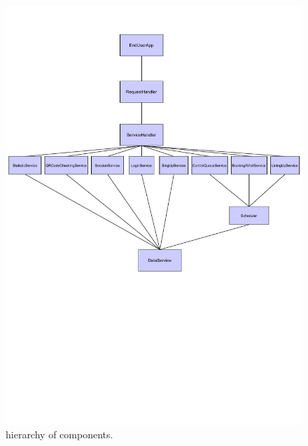 \begin{figure}[H]
    \centering
    \includegraphics[width=1.0\textwidth]{images/component_hierarchy.pdf}
    \caption{hierarchy of components.}
\end{figure}

